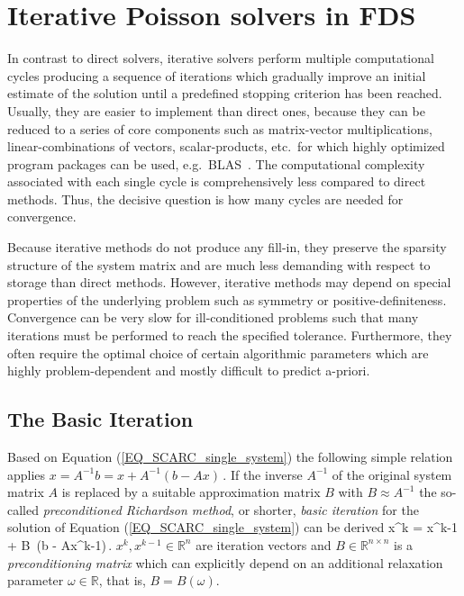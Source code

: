 \section{Iterative Poisson solvers in FDS}
In contrast to direct solvers, iterative solvers perform multiple computational cycles producing a sequence of iterations which gradually improve an initial estimate of the solution until a predefined stopping criterion has been reached. 
%
Usually, they are easier to implement than direct ones, because they can be reduced to a series of core components such as matrix-vector multiplications, linear-combinations of vectors, scalar-products, etc.\ for which highly optimized program packages can be used, e.g.\ BLAS~\cite{Dongarra:2002}.
%
The computational complexity associated with each single cycle is comprehensively less compared to direct methods. Thus, the decisive question is how many cycles are needed for convergence.

Because iterative methods do not produce any fill-in, they preserve the sparsity structure of the system matrix and are much less demanding with respect to storage than direct methods.
%
However, iterative methods may depend on special properties of the underlying problem such as symmetry or positive-definiteness. Convergence can be very slow for ill-conditioned problems such that many iterations must be performed to reach the specified tolerance. Furthermore, they often require the optimal choice of certain algorithmic parameters which are highly problem-dependent and mostly difficult to predict a-priori.


\subsection{The Basic Iteration}
\label{SEC_SCARC_basic_iteration}
Based on Equation (\ref{EQ_SCARC_single_system}) the following simple relation applies
$ %
x = A^{-1} b = x + A^{-1} (b-Ax)\,.
$ %
If the inverse $A^{-1}$ of the original system matrix $A$ is replaced by a suitable approximation matrix $B$ with $B \approx A^{-1}$
the so-called {\it preconditioned Richardson method}, or shorter, {\it basic iteration} for the solution of Equation (\ref{EQ_SCARC_single_system}) can be derived
\be 
  x^k = x^{k-1} + B\, (b - Ax^{k-1})\,. 
\label{EQ_SCARC_basic_iteration}
\ee
$x^k, x^{k-1} \in \mathbb{R}^{n}$ are iteration vectors and
$B \in \mathbb{R}^{n \times n}$ is a {\it preconditioning matrix} which can explicitly depend on an additional relaxation parameter $\omega\in \mathbb{R}$, that is, $B = B(\omega)$.

